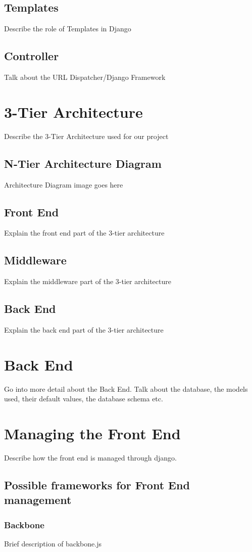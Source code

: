 \documentclass{l3proj}
\begin{document}
\subsection{Templates}
Describe the role of Templates in Django
\subsection{Controller}
Talk about the URL Dispatcher/Django Framework
\section{3-Tier Architecture}
Describe the 3-Tier Architecture used for our project
\subsection{N-Tier Architecture Diagram}
Architecture Diagram image goes here
\subsection{Front End}
Explain the front end part of the 3-tier architecture
\subsection{Middleware}
Explain the middleware part of the 3-tier architecture
\subsection{Back End}
Explain the back end part of the 3-tier architecture
\section{Back End}
Go into more detail about the Back End. Talk about the database, the models used, their default values, the database schema etc.
\section{Managing the Front End}
Describe how the front end is managed through django. 
\subsection{Possible frameworks for Front End management}
\subsubsection{Backbone}
Brief description of backbone.js
\end{document}
